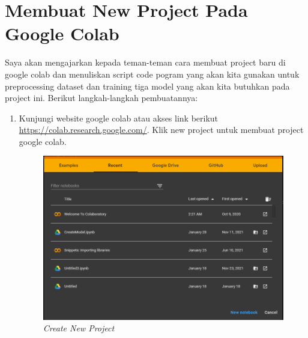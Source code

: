 \section{Membuat New Project Pada Google Colab}
Saya akan mengajarkan kepada teman-teman cara membuat project baru di google colab dan menuliskan script code pogram yang akan kita gunakan untuk preprocessing dataset dan training tiga model yang akan kita butuhkan pada project ini. Berikut langkah-langkah pembuatannya:

\begin{enumerate}

\item Kunjungi website google colab atau akses link berikut \url{https://colab.research.google.com/}. Klik new project untuk membuat project google colab.
\begin{figure}[H]
    \centering
    \includegraphics[scale=0.5]{figures/colab1}
    \caption{\textit{Create New Project}}
    \label{colab1}
\end{figure}


\end{enumerate}
